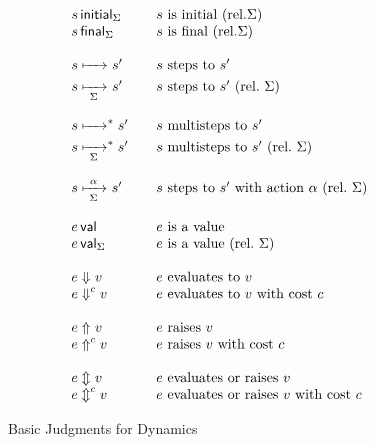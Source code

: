 \documentclass[11pt]{article}
\begin{document}
\begin{figure}[p]
    \begin{displaymath}
        \begin{array}{l@{\qquad}l}
            \iniSt[\Sigma]{s}            & s\ \text{is initial}\ (\text{rel.} \Sigma) \\
            \finSt[\Sigma]{s}            & s\ \text{is final}\ (\text{rel.} \Sigma) \\\\
            s\stepsTo s'         & s\ \text{steps to}\ s' \\
            s\stepsTo[\Sigma] s' & s\ \text{steps to}\ s'\ (\text{rel.}\ \Sigma)\\\\
            s\stepsTo(\ast) s' & s\ \text{multisteps to}\ s' \\
            s\stepsTo[\Sigma](\ast) s' & s\ \text{multisteps to}\ s'\ (\text{rel.}\ \Sigma) \\\\
            s\stepsTo[\Sigma]<\alpha> s' & s\ \text{steps to}\ s'\ \text{with action}\ \alpha\ (\text{rel.}\ \Sigma) \\\\
            \isVal{e}            &  e\ \text{is a value} \\
            \isVal[\Sigma]{e}    & e\ \text{is a value}\ (\text{rel.}\ \Sigma) \\\\
            e\evalsTo v          & e\ \text{evaluates to}\ v \\
            e\evalsTo(c) v       & e\ \text{evaluates to}\ v\ \text{with cost}\ c \\\\
            e\raisesUp v           & e\ \text{raises}\ v \\
            e\raisesUp(c) v        & e\ \text{raises}\ v\ \text{with cost}\ c \\\\
            e\hasResult v    & e\ \text{evaluates or raises}\ v \\
            e\hasResult(c) v    & e\ \text{evaluates or raises}\ v\ \text{with cost}\ c
        \end{array}
    \end{displaymath}

    \caption{Basic Judgments for Dynamics}
    \label{fig:dynamics}
\end{figure}
\end{document}
